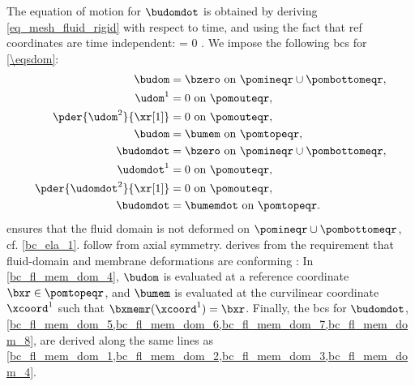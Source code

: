 The equation of motion for $\budomdot$ is obtained by deriving \cref{eq_mesh_fluid_rigid} with respect to time, and using the fact that \ac{ref} coordinates are time independent:
\be
\label{eq_mesh_fluid_rigid_dot}
\pder{}{\xr[\beta]}  = 0  \omr.
\ee
We impose the following \acp{bc} for  \cref{\eqsdom}:
\begin{align}
    \label{bc_fl_mem_dom_1}
    \budom                    & = \bzero \text{ on }\pomineqr \cup \pombottomeqr, \\
    \label{bc_fl_mem_dom_2}
    \udom^1                   & = 0 \text{ on } \pomouteqr,                       \\
    \label{bc_fl_mem_dom_3}
    \pder{\udom^2}{\xr[1]}    & = 0 \text{ on }\pomouteqr,                        \\
    \label{bc_fl_mem_dom_4}
    \budom                    & = \bumem \text{ on }\pomtopeqr,                   \\
    \label{bc_fl_mem_dom_5}
    \budomdot                 & = \bzero \text{ on }\pomineqr \cup \pombottomeqr, \\
    \label{bc_fl_mem_dom_6}
    \udomdot^1                & = 0 \text{ on } \pomouteqr,                       \\
    \label{bc_fl_mem_dom_7}
    \pder{\udomdot^2}{\xr[1]} & = 0 \text{ on }\pomouteqr,                        \\
    \label{bc_fl_mem_dom_8}
    \budomdot                 & = \bumemdot \text{ on }\pomtopeqr.
\end{align}
 ensures that the fluid domain is not deformed on $\pomineqr \cup \pombottomeqr$, cf. \cref{bc_ela_1}.  follow from axial symmetry.
 derives from the requirement that  fluid-domain and membrane deformations are conforming \cite{kamenskyLectureNotesMAE}: In \cref{bc_fl_mem_dom_4}, $\budom$ is evaluated at a reference coordinate $\bxr \in \pomtopeqr$, and $\bumem$ is evaluated at the curvilinear coordinate $\xcoord^1$ such that $\bxmemr(\xcoord^1) = \bxr$. Finally, the  \acp{bc} for $\budomdot$, \cref{bc_fl_mem_dom_5,bc_fl_mem_dom_6,bc_fl_mem_dom_7,bc_fl_mem_dom_8}, are derived along the same lines as \cref{bc_fl_mem_dom_1,bc_fl_mem_dom_2,bc_fl_mem_dom_3,bc_fl_mem_dom_4}.



